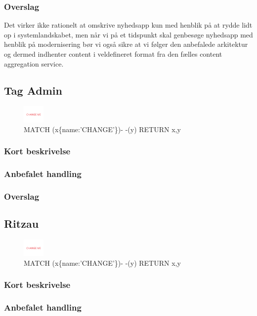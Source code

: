 \documentclass{article}
\begin{document}
\subsubsection{Overslag}
Det virker ikke rationelt at omskrive nyhedsapp kun med henblik på at rydde lidt op i systemlandskabet, men når vi på et tidspunkt skal genbesøge nyhedsapp med henblik på modernisering bør vi også sikre at vi følger den anbefalede arkitektur og dermed indhenter content i veldefineret format fra den fælles content aggregation service.

\subsection{Tag Admin}
\begin{figure}[h]
\includegraphics[width=30pt]{CHANGE.PNG}
\caption{MATCH (x\{name:'CHANGE'\})- -(y) RETURN x,y}
\end{figure}
\subsubsection{Kort beskrivelse}
\subsubsection{Anbefalet handling}
\subsubsection{Overslag}


\subsection{Ritzau}
\begin{figure}[h]
\includegraphics[width=30pt]{CHANGE.PNG}
\caption{MATCH (x\{name:'CHANGE'\})- -(y) RETURN x,y}
\end{figure}
\subsubsection{Kort beskrivelse}
\subsubsection{Anbefalet handling}
\end{document}
